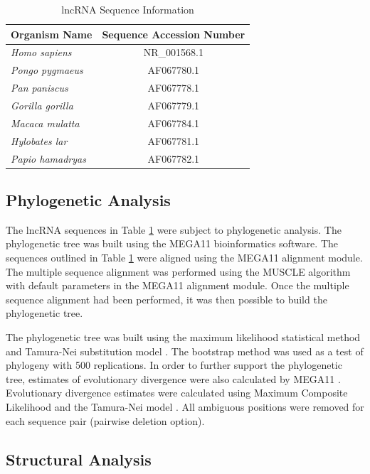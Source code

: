 \documentclass[conference, 11pt]{IEEEtran}
\begin{document}
\begin{table}[ht]
  \centering
  \caption{lncRNA Sequence Information}
  \label{tbl:accession}
  \begin{tabular}{lc}
    \toprule
    Organism Name & Sequence Accession Number \\
    \midrule
    \emph{Homo sapiens}    & NR\_001568.1 \\
    \emph{Pongo pygmaeus}  & AF067780.1 \\
    \emph{Pan paniscus}    & AF067778.1 \\
    \emph{Gorilla gorilla} & AF067779.1 \\
    \emph{Macaca mulatta}  & AF067784.1 \\
    \emph{Hylobates lar}   & AF067781.1 \\
    \emph{Papio hamadryas} & AF067782.1 \\
    \bottomrule
  \end{tabular}
\end{table}

\subsection{Phylogenetic Analysis}\label{sec:phylo}

The lncRNA sequences in Table \ref{tbl:accession} were subject to phylogenetic analysis.
The phylogenetic tree was built using the MEGA11 \cite{tamura2021mega11} bioinformatics software. 
The sequences outlined in Table \ref{tbl:accession} were aligned using the MEGA11 alignment module. 
The multiple sequence alignment was performed using the MUSCLE algorithm \cite{edgar2004muscle} with default parameters in the MEGA11 alignment module. 
Once the multiple sequence alignment had been performed, it was then possible to build the phylogenetic tree. 

The phylogenetic tree was built using the maximum likelihood statistical method and Tamura-Nei substitution model \cite{tamura1993estimation, tamura2004prospects}. 
The bootstrap method was used as a test of phylogeny with 500 replications.
In order to further support the phylogenetic tree, estimates of evolutionary divergence were also calculated by MEGA11 \cite{tamura2021mega11}. 
Evolutionary divergence estimates were calculated using Maximum Composite Likelihood and the Tamura-Nei model \cite{tamura1993estimation, tamura2004prospects}. 
All ambiguous positions were removed for each sequence pair (pairwise deletion option). 

\subsection{Structural Analysis}\label{sec:structure}
\end{document}
